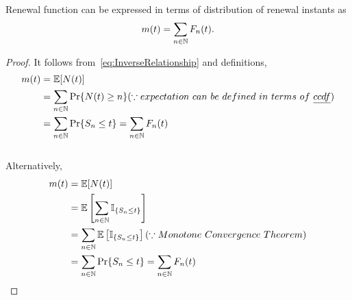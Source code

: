 \documentclass[a4paper,10pt, english]{article}
\begin{document}
\begin{prop} Renewal function can be expressed in terms of distribution of renewal instants as
	\begin{align*} 
	m(t) = \sum_{n \in \mathbb{N}} F_n(t).
	\end{align*}
\end{prop}
\begin{proof} It follows from~\eqref{eq:InverseRelationship} and definitions,
	\begin{align*}
	m(t) &= \mathbb{E}[N(t)] \\ &= \sum_{n \in \mathbb{N}} \Pr\{N(t) \geq n\} (\because expectation~can~be~defined~ in~ terms~ of~ \emph{ccdf}) \\ &= \sum_{n \in \mathbb{N}} \Pr\{S_n \leq t\} = \sum_{n \in \mathbb{N}} F_n(t)
	\end{align*}
	\\
	Alternatively,
	\begin{align*}
	m(t) &= \mathbb{E}[N(t)] \\
	&= \mathbb{E} \left[\sum_{n \in \mathbb{N}} \mathbb{I}_{\{S_n \leq t\}} \right] \\
	&= \sum_{n \in \mathbb{N}} \mathbb{E} \left[ \mathbb{I}_{\{S_n \leq t\}} \right] (\because Monotone~ Convergence~ Theorem) \\
	&= \sum_{n \in \mathbb{N}} \Pr\{S_n \leq t\} = \sum_{n \in \mathbb{N}} F_n(t)
	\end{align*}
\end{proof}
\end{document}
